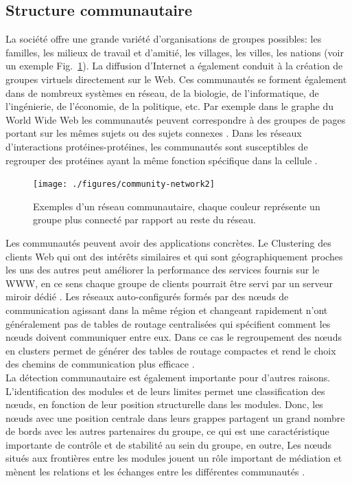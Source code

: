 \subsection{Structure communautaire}
La société offre une grande variété d'organisations de groupes possibles: les familles, les milieux de travail et d'amitié, les villages, les villes, les nations (voir un exemple Fig.~\ref{community-network}). La diffusion d'Internet a également conduit à la création de groupes virtuels directement sur le Web. Ces communautés se forment également dans de nombreux systèmes en réseau, de la biologie, de l'informatique, de l'ingénierie, de l'économie, de la politique, etc. Par exemple dans le graphe du World Wide Web les communautés peuvent correspondre à des groupes de pages portant sur les mêmes sujets ou des sujets connexes \cite{Dou-al2007,Flak-al2002}. Dans les réseaux d'interactions protéines-protéines, les communautés sont susceptibles de regrouper des protéines ayant la même fonction spécifique dans la cellule \cite{ChY2006,RivT2003}.\\

\begin{figure}[h!]
	\centering
	\texttt{[image: ./figures/community-network2]}
	\caption{Exemples d'un réseau communautaire, chaque couleur représente un groupe plus connecté par rapport au reste du réseau.}
	\label{community-network}
\end{figure}

Les communautés peuvent avoir des applications concrètes. Le Clustering des clients Web qui ont des intérêts similaires et qui sont géographiquement proches les uns des autres peut améliorer la performance des services fournis sur le WWW, en ce sens chaque groupe de clients pourrait être servi par un serveur miroir dédié \cite{KriW2000}.
Les réseaux auto-configurés formés par des nœuds de communication agissant dans la même région et changeant rapidement n'ont généralement pas de tables de routage centralisées qui spécifient comment les nœuds doivent communiquer entre eux.
Dans ce cas le regroupement des nœuds en clusters permet de générer des tables de routage compactes et rend le choix des chemins de communication plus efficace \cite{Steen2001}.\\
La détection communautaire est également importante pour d'autres raisons. L'identification des modules et de leurs limites permet une classification des nœuds, en fonction de leur position structurelle dans les modules. Donc, les nœuds avec une position centrale dans leurs grappes partagent un grand nombre de bords avec les autres partenaires du groupe, ce qui est une caractéristique importante de contrôle et de stabilité au sein du groupe, en outre, Les nœuds situés aux frontières entre les modules jouent un rôle important de médiation et mènent les relations et les échanges entre les différentes communautés \cite{Csermely2008}.

